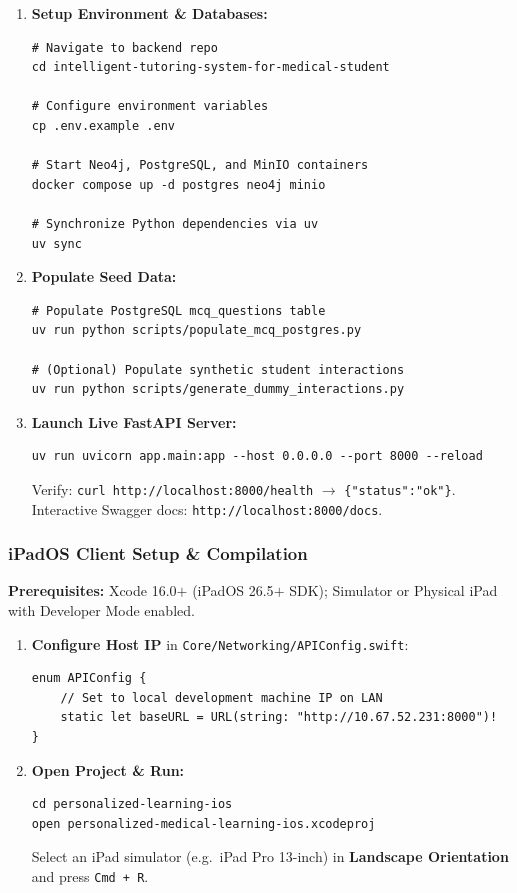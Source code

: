 \begin{enumerate}
    \item \textbf{Setup Environment \& Databases:}
\begin{verbatim}
# Navigate to backend repo
cd intelligent-tutoring-system-for-medical-student

# Configure environment variables
cp .env.example .env

# Start Neo4j, PostgreSQL, and MinIO containers
docker compose up -d postgres neo4j minio

# Synchronize Python dependencies via uv
uv sync
\end{verbatim}

    \item \textbf{Populate Seed Data:}
\begin{verbatim}
# Populate PostgreSQL mcq_questions table
uv run python scripts/populate_mcq_postgres.py

# (Optional) Populate synthetic student interactions
uv run python scripts/generate_dummy_interactions.py
\end{verbatim}

    \item \textbf{Launch Live FastAPI Server:}
\begin{verbatim}
uv run uvicorn app.main:app --host 0.0.0.0 --port 8000 --reload
\end{verbatim}
Verify: \texttt{curl http://localhost:8000/health} $\to$ \texttt{\{"status":"ok"\}}.
Interactive Swagger docs: \texttt{http://localhost:8000/docs}.
\end{enumerate}

\subsubsection*{iPadOS Client Setup \& Compilation}

\textbf{Prerequisites:} Xcode 16.0$+$ (iPadOS 26.5$+$ SDK); Simulator or Physical iPad with
Developer Mode enabled.

\begin{enumerate}
    \item \textbf{Configure Host IP} in
          \texttt{Core/Networking/APIConfig.swift}:
\begin{verbatim}
enum APIConfig {
    // Set to local development machine IP on LAN
    static let baseURL = URL(string: "http://10.67.52.231:8000")!
}
\end{verbatim}

    \item \textbf{Open Project \& Run:}
\begin{verbatim}
cd personalized-learning-ios
open personalized-medical-learning-ios.xcodeproj
\end{verbatim}
Select an iPad simulator (e.g.\ iPad Pro 13-inch) in \textbf{Landscape Orientation} and
press \texttt{Cmd + R}.
\end{enumerate}


